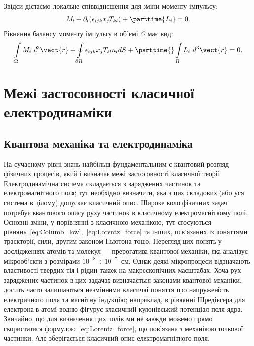 Звідси дістаємо локальне співвідношення для зміни моменту імпульсу:
\begin{equation}
	M_i + \partial_l( \epsilon_{ijk}  x_jT_{kl}) + \parttime{L_i} = 0.
\end{equation}
Рівняння балансу моменту імпульсу в об'ємі $\Omega$ має вид:
\begin{equation}
	\int\limits_{\Omega} M_i \ d^3\vect{r} + \oint\limits_{\partial\Omega} \epsilon_{ijk}  x_jT_{kl} n_l dS +
	\parttime{} \int\limits_{\Omega} L_i \ d^3\vect{r} = 0.
\end{equation}


\section{Межі застосовності класичної електродинаміки}\label{sec:CED_limits}

\subsection*{Квантова механіка та електродинаміка}


На сучасному рівні знань найбільш фундаментальним є квантовий розгляд фізичних процесів, який і визначає межі
застосовності класичної теорії. Електродинамічна система складається з заряджених частинок та електромагнітного поля;
тут необхідно визначити, яка з цих складових (або уся система в цілому) допускає класичний опис. Широке коло фізичних
задач потребує квантового опису руху частинок в класичному електромагнітному полі. Основні зміни, у порівнянні з
класичною механікою, тут стосуються рівнянь~\eqref{eq:Columb_low},~\eqref{eq:Lorentz_force} та інших, пов'язаних із
поняттями траєкторії, сили, другим законом Ньютона тощо. Перегляд цих понять у дослідженнях атомів та молекул ---
прерогатива квантової механіки, яка аналізує мікрооб'єкти з розмірами $10^{-8} \div 10^{-7}$~см. Однак деякі
мікропроцеси відзначають властивості твердих тіл і рідин також на макроскопічних масштабах. Хоча рух заряджених частинок
в цих задачах визначається законами квантової механіки, досить часто залишаються незмінними класичні поняття про
напруженість електричного поля та магнітну індукцію; наприклад, в рівнянні Шредінгера для електрона в атомі водню
фігурує класичний кулонівський потенціал поля ядра. Звичайно, що для визначення цих полів ми не завжди можемо прямо
скористатися формулою~\eqref{eq:Lorentz_force}, що пов'язана з механікою точкової частинки. Але зберігається класичний
опис електромагнітного поля.


